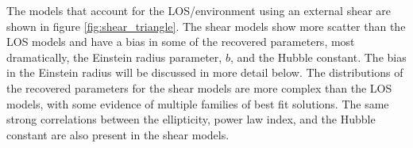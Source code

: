 The models that account for the LOS/environment using an external shear are shown in figure \ref{fig:shear_triangle}. The shear models show more scatter than the LOS models and have a bias in some of the recovered parameters, most dramatically, the Einstein radius parameter, $b$, and the Hubble constant. The bias in the Einstein radius will be discussed in more detail below. The distributions of the recovered parameters for the shear models are more complex than the LOS models, with some evidence of multiple families of best fit solutions. The same strong correlations between the ellipticity, power law index, and the Hubble constant are also present in the shear models. 